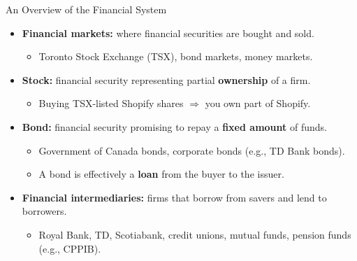 \documentclass[aspectratio=169]{beamer}
\begin{document}
\begin{frame}{An Overview of the Financial System}
\transfade
\begin{itemize}[<+->]
  \item \textbf{Financial markets:} where financial securities are bought and sold.
  \begin{itemize}[<+->]
    \item Toronto Stock Exchange (TSX), bond markets, money markets.
  \end{itemize}
  \item \textbf{Stock:} financial security representing partial \textbf{ownership} of a firm.
  \begin{itemize}[<+->]
    \item Buying TSX-listed Shopify shares $\Rightarrow$ you own part of Shopify.
  \end{itemize}
  \item \textbf{Bond:} financial security promising to repay a \textbf{fixed amount} of funds.
  \begin{itemize}[<+->]
    \item Government of Canada bonds, corporate bonds (e.g., TD Bank bonds).
    \item A bond is effectively a \textbf{loan} from the buyer to the issuer.
  \end{itemize}
  \item \textbf{Financial intermediaries:} firms that borrow from savers and lend to borrowers.
  \begin{itemize}[<+->]
    \item Royal Bank, TD, Scotiabank, credit unions, mutual funds, pension funds (e.g., CPPIB).
  \end{itemize}
\end{itemize}
\end{frame}
\end{document}
